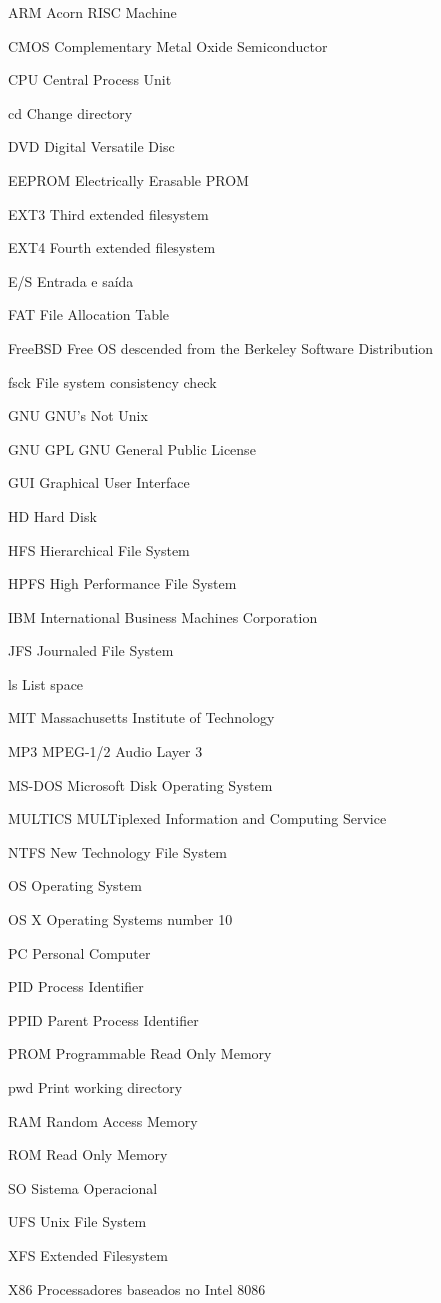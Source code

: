 \begin{siglas}
    \item[ARM] Acorn RISC Machine
    \item[CMOS] Complementary Metal Oxide Semiconductor
    \item[CPU] Central Process Unit
    \item[cd] Change directory
    \item[DVD]  Digital Versatile Disc
    \item[EEPROM] Electrically Erasable PROM 
    \item[EXT3] Third extended filesystem
    \item[EXT4] Fourth extended filesystem
    \item[E/S] Entrada e saída
    \item[FAT] File Allocation Table
    \item[FreeBSD] Free OS descended from the Berkeley Software Distribution 
    \item[fsck] File system consistency check
    \item[GNU] GNU's Not Unix
    \item[GNU GPL] GNU General Public License
    \item[GUI] Graphical User Interface
    \item[HD] Hard Disk
    \item[HFS] Hierarchical File System
    \item[HPFS] High Performance File System
    \item[IBM] International Business Machines Corporation
    \item[JFS] Journaled File System
    \item[ls] List space
    \item[MIT] Massachusetts Institute of Technology
    \item[MP3] MPEG-1/2 Audio Layer 3
    \item[MS-DOS] Microsoft Disk Operating System
    \item[MULTICS] MULTiplexed Information and Computing Service 
    \item[NTFS] New Technology File System
    \item[OS] Operating System  
    \item[OS X] Operating Systems number 10 
    \item[PC] Personal Computer
    \item[PID] Process Identifier
    \item[PPID] Parent Process Identifier
    \item[PROM] Programmable Read Only Memory
    \item[pwd] Print working directory
    \item[RAM] Random Access Memory
    \item[ROM] Read Only Memory 
    \item[SO] Sistema Operacional
    \item[UFS] Unix File System
    \item[XFS] Extended Filesystem
    \item[X86] Processadores baseados no Intel 8086
\end{siglas}